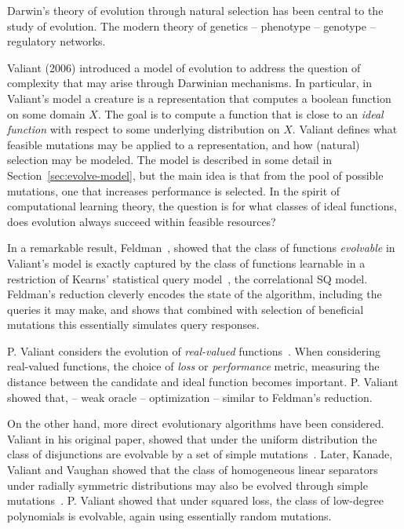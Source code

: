 Darwin's theory of evolution through natural selection has been central to the
study of evolution. The modern theory of genetics  -- phenotype -- genotype --
regulatory networks. 

Valiant (2006) introduced a model of evolution to address the question of
complexity that may arise through Darwinian mechanisms. In particular, in
Valiant's model a creature is a representation that computes a boolean function
on some domain $X$. The goal is to compute a function that is close to an
\emph{ideal function} with respect to some underlying distribution on $X$.
Valiant defines what feasible mutations may be applied to a representation, and
how (natural) selection may be modeled. The model is described in some detail in
Section~\ref{sec:evolve-model}, but the main idea is that from the pool of
possible mutations, one that increases performance is selected. In the spirit of
computational learning theory, the question is for what classes of ideal
functions, does evolution always succeed within feasible resources?

In a remarkable result, Feldman~\cite{Feldman:2008}, showed that the class of
functions \emph{evolvable} in Valiant's model is exactly captured by the class
of functions learnable in a restriction of Kearns' statistical query
model~\cite{Kearns:1998}, the correlational SQ model. Feldman's reduction
cleverly encodes the state of the algorithm, including the queries it may make,
and shows that combined with selection of beneficial mutations this essentially
simulates query responses. 

P. Valiant considers the evolution of \emph{real-valued}
functions~\cite{Valiant:2012-reals}. When considering real-valued functions, the
choice of \emph{loss} or \emph{performance} metric, measuring the distance
between the candidate and ideal function becomes important. P. Valiant showed
that,  -- weak oracle -- optimization -- similar to Feldman's reduction.

On the other hand, more direct evolutionary algorithms have been considered.
Valiant in his original paper, showed that under the uniform distribution the
class of disjunctions are evolvable by a set of simple
mutations~\cite{Valiant:2009}. Later, Kanade, Valiant and Vaughan showed that
the class of homogeneous linear separators under radially symmetric
distributions may also be evolved through simple mutations~\cite{KVV:2010}. P.
Valiant showed that under squared loss, the class of low-degree polynomials is
evolvable, again using essentially random mutations.

